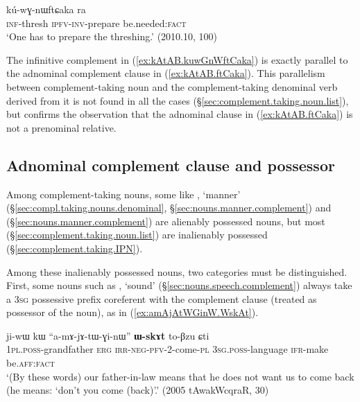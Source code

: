  \begin{exe}
\ex \label{ex:kAtAB.kuwGnWftCaka}
\gll [kɤ-tɤβ] kú-wɣ-nɯftɕaka ra \\
\textsc{inf}-thresh \textsc{ipfv}-\textsc{inv}-prepare be.needed:\textsc{fact} \\
\glt `One has to prepare the threshing.'  (2010.10, 100)
\end{exe}

The infinitive complement  in (\ref{ex:kAtAB.kuwGnWftCaka}) is exactly parallel to the adnominal complement clause in (\ref{ex:kAtAB.ftCaka}). This parallelism between complement-taking noun and the complement-taking denominal verb derived from it is not found in all the cases (§\ref{sec:complement.taking.noun.list}), but confirms the observation that the adnominal clause in (\ref{ex:kAtAB.ftCaka}) is not a prenominal relative.

\subsection{Adnominal complement clause and possessor} \label{sec:complement.taking.noun.possessor}
Among complement-taking nouns, some like , `manner' (§\ref{sec:compl.taking.nouns.denominal}, §\ref{sec:nouns.manner.complement}) and  (§\ref{sec:nouns.manner.complement}) are alienably possessed nouns, but most (§\ref{sec:complement.taking.noun.list}) are inalienably possessed (§\ref{sec:complement.taking.IPN}).

Among these inalienably possessed nouns, two categories must be distinguished. First, some nouns such as , `sound' (§\ref{sec:nouns.speech.complement}) always take a \textsc{3sg} possessive prefix coreferent with the complement clause (treated as possessor of the noun), as in (\ref{ex:amAjAtWGinW.WskAt}).

\begin{exe}
\ex \label{ex:amAjAtWGinW.WskAt}
\gll ji-wɯ kɯ ``a-mɤ-jɤ-tɯ-ɣi-nɯ'' \textbf{ɯ-skɤt} to-βzu ɕti \\
\textsc{1pl}.\textsc{poss}-grandfather \textsc{erg} \textsc{irr}-\textsc{neg}-\textsc{pfv}-2-come-\textsc{pl} \textsc{3sg}.\textsc{poss}-language \textsc{ifr}-make be.\textsc{aff}:\textsc{fact} \\
\glt `(By these words) our father-in-law means that he does not want us to come back (he means: `don't you come (back)'.' (2005 tAwakWcqraR, 30)
\end{exe}

